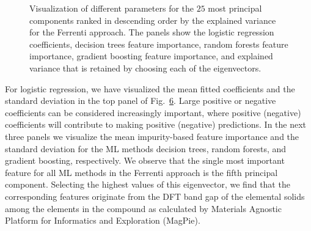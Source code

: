 \documentclass[superscriptaddress,unsortedaddress,
 amsmath,amssymb,
 aps,
]{revtex4-2}
\begin{document}
\begin{figure}[ht!]
  \begin{subfigure}[b]{0.5\textwidth}
    \centering
    
    \label{fig:01-fi-a}
  \end{subfigure}%

  \begin{subfigure}[b]{0.5\textwidth}
    \centering
    
    \label{fig:01-fi-b}
  \end{subfigure}%

  \begin{subfigure}[b]{0.5\textwidth}
    \centering
    
    \label{fig:01-fi-c}
  \end{subfigure}%

  \begin{subfigure}[b]{0.5\textwidth}
    \centering
    
    \label{fig:01-fi-d}
  \end{subfigure}%

  \begin{subfigure}[b]{0.5\textwidth}
    \centering
    
    \label{fig:01-fi-e}
  \end{subfigure}%

  \caption{Visualization of different parameters for the $25$ most principal components ranked in descending order by the explained variance for the Ferrenti approach. The panels show the logistic regression coefficients, decision trees feature importance, random forests feature importance, gradient boosting feature importance, and explained variance that is retained by choosing each of the eigenvectors. }
  \label{fig:01-fi}
\end{figure}


For logistic regression, we have visualized the mean fitted coefficients and the standard deviation in the top panel of Fig.~\ref{fig:01-fi}. Large positive or negative coefficients can be considered increasingly important, where positive (negative) coefficients will contribute to making positive (negative) predictions. In the next three panels we visualize the mean impurity-based feature importance and the standard deviation for the ML methods decision trees, random forests, and gradient boosting, respectively. We observe that the single most important feature for all ML methods in the Ferrenti approach is the fifth principal component. Selecting the highest values of this eigenvector, we find that the corresponding features originate from the DFT band gap of the elemental solids among the elements in the compound as calculated by Materials Agnostic Platform for Informatics and Exploration (MagPie). 
\end{document}

